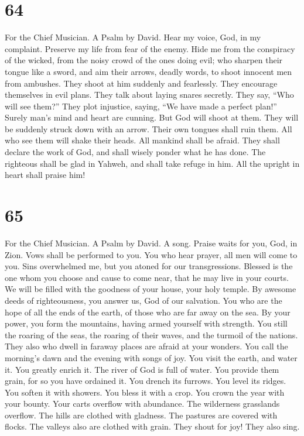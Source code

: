 \hypertarget{section-62}{%
\section{64}\label{section-62}}

For the Chief Musician. A Psalm by David.  Hear my voice,
God, in my complaint. Preserve my life from fear of the enemy.
 Hide me from the conspiracy of the wicked, from the noisy
crowd of the ones doing evil;  who sharpen their tongue like
a sword, and aim their arrows, deadly words,  to shoot
innocent men from ambushes. They shoot at him suddenly and fearlessly.
 They encourage themselves in evil plans. They talk about
laying snares secretly. They say, ``Who will see them?'' 
They plot injustice, saying, ``We have made a perfect plan!'' Surely
man's mind and heart are cunning.  But God will shoot at
them. They will be suddenly struck down with an arrow. 
Their own tongues shall ruin them. All who see them will shake their
heads.  All mankind shall be afraid. They shall declare the
work of God, and shall wisely ponder what he has done.  The
righteous shall be glad in Yahweh, and shall take refuge in him. All the
upright in heart shall praise him!

\hypertarget{section-63}{%
\section{65}\label{section-63}}

For the Chief Musician. A Psalm by David. A song.  Praise
waits for you, God, in Zion. Vows shall be performed to you.
 You who hear prayer, all men will come to you. 
Sins overwhelmed me, but you atoned for our transgressions. 
Blessed is the one whom you choose and cause to come near, that he may
live in your courts. We will be filled with the goodness of your house,
your holy temple.  By awesome deeds of righteousness, you
answer us, God of our salvation. You who are the hope of all the ends of
the earth, of those who are far away on the sea.  By your
power, you form the mountains, having armed yourself with strength.
 You still the roaring of the seas, the roaring of their
waves, and the turmoil of the nations.  They also who dwell
in faraway places are afraid at your wonders. You call the morning's
dawn and the evening with songs of joy.  You visit the
earth, and water it. You greatly enrich it. The river of God is full of
water. You provide them grain, for so you have ordained it.
 You drench its furrows. You level its ridges. You soften
it with showers. You bless it with a crop.  You crown the
year with your bounty. Your carts overflow with abundance. 
The wilderness grasslands overflow. The hills are clothed with gladness.
 The pastures are covered with flocks. The valleys also are
clothed with grain. They shout for joy! They also sing.

